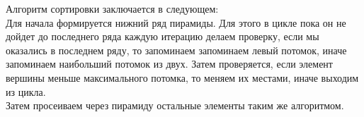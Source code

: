 \begin{spacing}{1}

\indent Алгоритм сортировки заключается в следующем:\\
\indent Для начала формируется нижний ряд пирамиды. Для этого в цикле пока он не дойдет до последнего ряда каждую итерацию делаем проверку, если мы оказались в последнем ряду, то запоминаем запоминаем левый потомок, иначе запоминаем наибольший потомок из двух. Затем проверяется, если элемент вершины меньше максимального потомка, то меняем их местами, иначе выходим из цикла.\\
\indent Затем просеиваем через пирамиду остальные элементы таким же алгоритмом.
\\


\end{spacing}